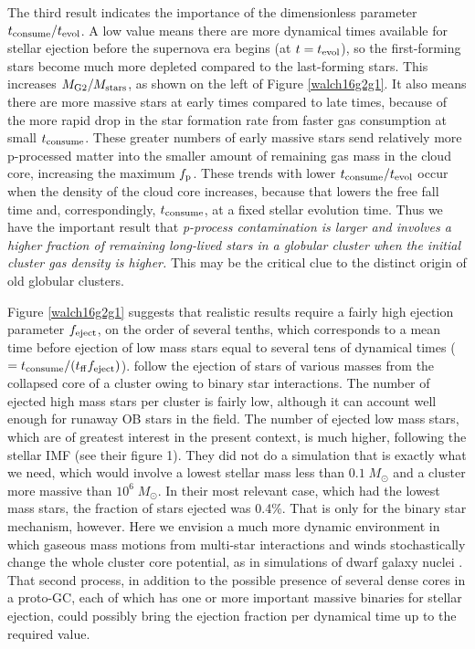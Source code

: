 \documentclass[12pt,preprint]{aastex}
\begin{document}
The third result indicates the importance of the dimensionless parameter $t_{\rm
consume}/t_{\rm evol}$. A low value means there are more dynamical times available
for stellar ejection before the supernova era begins (at $t=t_{\rm evol}$), so the
first-forming stars become much more depleted compared to the last-forming stars.
This increases $M_{\rm G2}/M_{\rm stars}$, as shown on the left of Figure
\ref{walch16g2g1}. It also means there are more massive stars at early times
compared to late times, because of the more rapid drop in the star formation rate
from faster gas consumption at small $t_{\rm consume}$. These greater numbers of
early massive stars send relatively more p-processed matter into the smaller amount
of remaining gas mass in the cloud core, increasing the maximum $f_{\rm p}$. These
trends with lower $t_{\rm consume}/t_{\rm evol}$ occur when the density of the
cloud core increases, because that lowers the free fall time and, correspondingly,
$t_{\rm consume}$, at a fixed stellar evolution time. Thus we have the important
result that {\it p-process contamination is larger and involves a higher fraction
of remaining long-lived stars in a globular cluster when the initial cluster gas
density is higher.}  This may be the critical clue to the distinct origin of old
globular clusters.

Figure \ref{walch16g2g1} suggests that realistic results require a fairly high
ejection parameter $f_{\rm eject}$, on the order of several tenths, which
corresponds to a mean time before ejection of low mass stars equal to several tens
of dynamical times ($=t_{\rm consume}/(t_{\rm ff}f_{\rm eject})$).  \cite{fujii13}
follow the ejection of stars of various masses from the collapsed core of a cluster
owing to binary star interactions. The number of ejected high mass stars per
cluster is fairly low, although it can account well enough for runaway OB stars in
the field. The number of ejected low mass stars, which are of greatest interest in
the present context, is much higher, following the stellar IMF (see their figure
1). They did not do a simulation that is exactly what we need, which would involve
a lowest stellar mass less than $0.1\;M_\odot$ and a cluster more massive than
$10^6\;M_\odot$. In their most relevant case, which had the lowest mass stars, the
fraction of stars ejected was 0.4\%. That is only for the binary star mechanism,
however. Here we envision a much more dynamic environment in which gaseous mass
motions from multi-star interactions and winds stochastically change the whole
cluster core potential, as in simulations of dwarf galaxy nuclei \citep{elbadry16}.
That second process, in addition to the possible presence of several dense cores in
a proto-GC, each of which has one or more important massive binaries for stellar
ejection, could possibly bring the ejection fraction per dynamical time up to the
required value.
\end{document}

